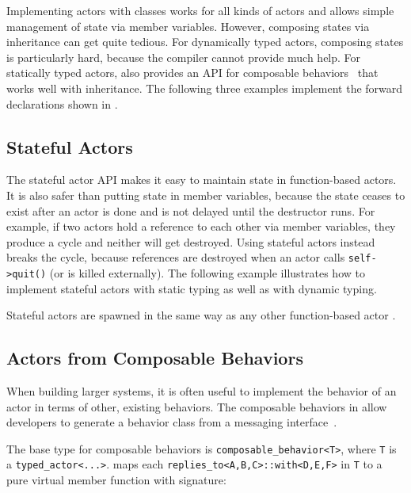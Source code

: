 Implementing actors with classes works for all kinds of actors and allows
simple management of state via member variables. However, composing states via
inheritance can get quite tedious. For dynamically typed actors, composing
states is particularly hard, because the compiler cannot provide much help. For
statically typed actors, \lib also provides an API for composable
behaviors~ that works well with inheritance. The
following three examples implement the forward declarations shown in
.


\clearpage
\subsection{Stateful Actors}
\label{stateful-actor}

The stateful actor API makes it easy to maintain state in function-based
actors. It is also safer than putting state in member variables, because the
state ceases to exist after an actor is done and is not delayed until the
destructor runs. For example, if two actors hold a reference to each other via
member variables, they produce a cycle and neither will get destroyed. Using
stateful actors instead breaks the cycle, because references are destroyed when
an actor calls \lstinline^self->quit()^ (or is killed externally). The
following example illustrates how to implement stateful actors with static
typing as well as with dynamic typing.


Stateful actors are spawned in the same way as any other function-based actor
.


\clearpage
\subsection{Actors from Composable Behaviors \experimental}
\label{composable-behavior}

When building larger systems, it is often useful to implement the behavior of
an actor in terms of other, existing behaviors. The composable behaviors in
\lib allow developers to generate a behavior class from a messaging
interface~.

The base type for composable behaviors is \lstinline^composable_behavior<T>^,
where \lstinline^T^ is a \lstinline^typed_actor<...>^. \lib maps each
\lstinline^replies_to<A,B,C>::with<D,E,F>^ in \lstinline^T^ to a pure virtual
member function with signature:

